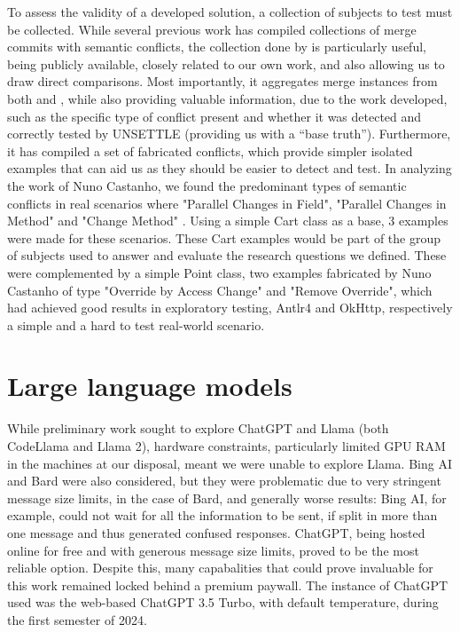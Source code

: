 To assess the validity of a developed solution, a collection of subjects to test must be collected. While several previous work has compiled collections of merge commits with semantic conflicts, the collection done by \citet{kn:nuno} is particularly useful, being publicly available, closely related to our own work, and also allowing us to draw direct comparisons. Most importantly, it aggregates merge instances from both \citet{kn:leuson} and \citet{kn:safemerge}, while also providing valuable information, due to the work developed, such as the specific type of conflict present and whether it was detected and correctly tested by UNSETTLE (providing us with a ``base truth''). Furthermore, it has compiled a set of fabricated conflicts, which provide simpler isolated examples that can aid us as they should be easier to detect and test.
In analyzing the work of Nuno Castanho, we found the predominant types of semantic conflicts in real scenarios where "Parallel Changes in Field", "Parallel Changes in Method" and "Change Method" \citet{kn:nuno}. Using a simple Cart class as a base, 3 examples were made for these scenarios.
These Cart examples would be part of the group of subjects used to answer and evaluate the research questions we defined. These were complemented by a simple Point class, two examples fabricated by Nuno Castanho of type "Override by Access Change" and "Remove Override", which had achieved good results in exploratory testing, Antlr4 and OkHttp, respectively a simple and a hard to test real-world scenario.


\section{Large language models}


While preliminary work sought to explore ChatGPT and Llama (both CodeLlama and Llama 2), hardware constraints, particularly limited GPU RAM in the machines at our disposal, meant we were unable to explore Llama.  Bing AI and Bard were also considered, but they were problematic due to very stringent message size limits, in the case of Bard, and generally worse results: Bing AI, for example, could not wait for all the information to be sent, if split in more than one message and thus generated confused responses. ChatGPT, being hosted online for free and with generous message size limits, proved to be the most reliable option. Despite this, many capabalities that could prove invaluable for this work remained locked behind a premium paywall.
The instance of ChatGPT used was the web-based ChatGPT 3.5 Turbo, with default temperature, during the first semester of 2024.

